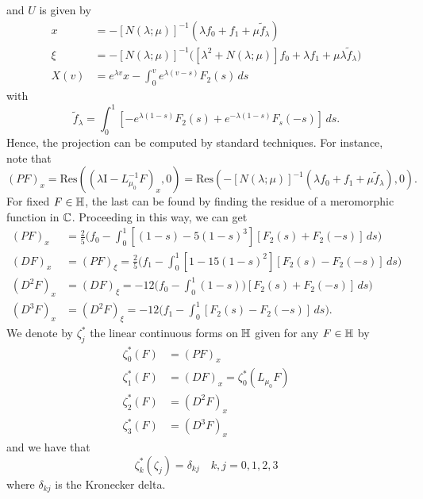 and \(U\) is given by
\begin{align}
	x &= -[N(\lambda;\mu)]^{-1}(\lambda f_0 + f_1 + \mu\tilde f_\lambda) \\
	\xi &= -[N(\lambda;\mu)]^{-1} \Big( [\lambda^2 + N(\lambda;\mu)]f_0 + \lambda f_1 + \mu\lambda \tilde f_\lambda \Big) \\
	X(v) &= e^{\lambda v}x - \int_0^v e^{\lambda(v-s)} F_2(s)\, ds
\end{align}
with 
\begin{equation}
	\tilde f_\lambda = \int_0^1 [-e^{\lambda(1-s)} F_2(s) + e^{-\lambda (1-s)} F_s(-s)]\, ds.
\end{equation}
Hence, the projection can be computed by standard techniques. For instance, note that 
\begin{equation}
	(PF)_x = \mathrm{Res}((\lambda \mathrm I - L_{\mu_0} ^{-1} F)_x, 0) = \mathrm{Res}(-[N(\lambda;\mu)]^{-1}(\lambda f_0 + f_1 + \mu\tilde f_\lambda), 0).
\end{equation}
For fixed \(F\in\mathbb{H}\), the last can be found by finding the residue of a meromorphic function in \(\mathbb{C}\). Proceeding in this way, we can get 
\begin{align}
	(PF)_x &= \frac 2 5 \Bigg(  f_0 - \int_0^1[(1-s) - 5(1-s)^3][F_2(s) + F_2(-s)]\, ds \Bigg) \\
	(DF)_x &= (PF)_\xi = \frac 2 5 \Bigg(  f_1 - \int_0^1[1 - 15(1-s)^2][F_2(s) - F_2(-s)]\, ds \Bigg) \\
	(D^2F)_x &= (DF)_\xi = -12 \Bigg( f_0 - \int_0^1(1-s)) [F_2(s) + F_2(-s)]\, ds \Bigg) \\
	(D^3F)_x &= (D^2 F)_\xi = -12 \Bigg(f_1 - \int_0^1 [F_2(s) - F_2(-s)]\, ds \Bigg).
\end{align}
We denote by \(\zeta_j^*\) the linear continuous forms on \(\mathbb{H}\) given for any \(F\in\mathbb{H}\) by
\begin{equation}
	\begin{aligned}
		\zeta_0^*(F)&= (PF)_x \\
		\zeta_1^*(F) &= (DF)_x  = \zeta_0^*(L_{\mu_0} F) \\
		\zeta_2^*(F) &= (D^2F)_x  \\
		\zeta_3^*(F) &= (D^3F)_x 
	\end{aligned}
\end{equation}
and we have that
\begin{equation}
	\zeta_k^*(\zeta_j) = \delta_{kj} \quad k,j = 0, 1, 2, 3
\end{equation}
where \(\delta_{kj}\) is the Kronecker delta.

